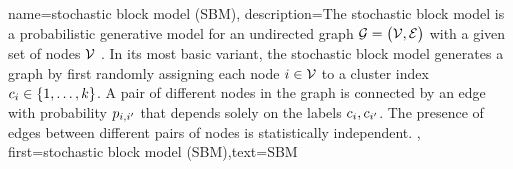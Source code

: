{name={stochastic block model (SBM)},
	description={The stochastic block \gls{model} is a 
		probabilistic generative \gls{model} for an undirected \gls{graph} $\mathcal{G} = \big( \mathcal{V}, \mathcal{E} \big)$ 
		with a given set of nodes $\mathcal{V}$ \cite{AbbeSBM2018}. In its most basic variant, 
		the stochastic block \gls{model} generates a \gls{graph} by first randomly assigning each node $i \in \mathcal{V}$ to 
		a \gls{cluster} index $c_{i} \in \{1,\ldots,k\}$. A pair of different nodes in the 
		\gls{graph} is connected by an edge with \gls{probability} $p_{i,i'}$ that depends 
		solely on the \gls{label}s $c_{i}, c_{i'}$. 
		The presence of edges between different pairs of 
		nodes is statistically independent. },
	first={stochastic block model (SBM)},text={SBM} 
}

\newcommand{\gaussiancenter}{3}

